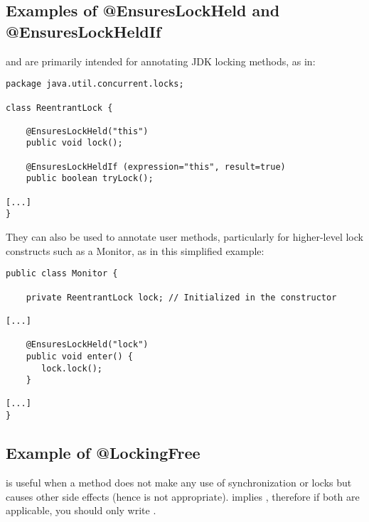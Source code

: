 \subsection{Examples of @EnsuresLockHeld and @EnsuresLockHeldIf\label{ensureslockheld-examples}}

 and  are primarily intended
for annotating JDK locking methods, as in:

\begin{Verbatim}
package java.util.concurrent.locks;

class ReentrantLock {

    @EnsuresLockHeld("this")
    public void lock();

    @EnsuresLockHeldIf (expression="this", result=true)
    public boolean tryLock();

[...]
}
\end{Verbatim}

They can also be used to annotate user methods, particularly for
higher-level lock constructs such as a Monitor, as in this simplified example:

\begin{Verbatim}
public class Monitor {

    private ReentrantLock lock; // Initialized in the constructor

[...]

    @EnsuresLockHeld("lock")
    public void enter() {
       lock.lock();
    }

[...]
}
\end{Verbatim}

\subsection{Example of @LockingFree\label{lock-lockingfree-example}}

 is useful when a method does not make any use of synchronization
or locks but causes other side effects (hence  is not appropriate).
 implies , therefore if both are applicable,
you should only write .


